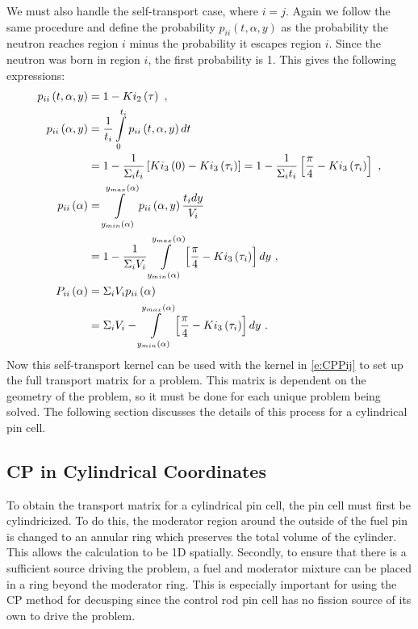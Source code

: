 We must also handle the self-transport case, where $i=j$.  Again we follow the same procedure and define the probability $p_{ii}\left(t, \alpha, y\right)$ as the probability the neutron reaches region $i$ minus the probability it escapes region $i$.  Since the neutron was born in region $i$, the first probability is 1.  This gives the following expressions:
\begin{subequations}\label{e:CPPii}
  \begin{align}
  p_{ii}\left(t,\alpha,y\right) &= 1 - Ki_2\left(\tau\right)\ , \\
  p_{ii}\left(\alpha,y\right) &= \frac{1}{t_i} \intop_0^{t_i} p_{ii}\left(t,\alpha,y\right) dt \nonumber \\
  &= 1- \frac{1}{\Sigma_i t_i} \left[Ki_3\left(0\right) - Ki_3\left(\tau_i\right)\right] = 1 - \frac{1}{\Sigma_i t_i} \left[\frac{\pi}{4} - Ki_3\left(\tau_i\right)\right]\ , \\
  p_{ii}\left(\alpha\right) &= \intop_{y_{min}\left(\alpha\right)}^{y_{max}\left(\alpha\right)} p_{ii}\left(\alpha,y\right) \frac{t_i dy}{V_i} \nonumber\\
  &= 1 - \frac{1}{\Sigma_i V_i} \intop_{y_{min}\left(\alpha\right)}^{y_{max}\left(\alpha\right)} \left[\frac{\pi}{4} - Ki_3\left(\tau_i\right)\right] dy\ , \\
  P_{ii}\left(\alpha\right) &= \Sigma_i V_i p_{ii}\left(\alpha\right) \nonumber \\
  &= \Sigma_i V_i - \intop_{y_{min}\left(\alpha\right)}^{y_{max}\left(\alpha\right)} \left[\frac{\pi}{4} - Ki_3\left(\tau_i\right)\right] dy\ .
  \end{align}
\end{subequations}
Now this self-transport kernel can be used with the kernel in \ref{e:CPPij} to set up the full transport matrix for a problem.  This matrix is dependent on the geometry of the problem, so it must be done for each unique problem being solved.  The following section discusses the details of this process for a cylindrical pin cell.

\subsection{CP in Cylindrical Coordinates}\label{appsubsec:CPcylCoord}

To obtain the transport matrix for a cylindrical pin cell, the pin cell must first be cylindricized.  To do this, the moderator region around the outside of the fuel pin is changed to an annular ring which preserves the total volume of the cylinder.  This allows the calculation to be 1D spatially.  Secondly, to ensure that there is a sufficient source driving the problem, a fuel and moderator mixture can be placed in a ring beyond the moderator ring.  This is especially important for using the CP method for decusping since the control rod pin cell has no fission source of its own to drive the problem.


